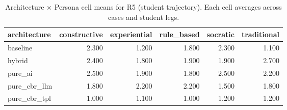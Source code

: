 \begin{table}[htbp]
\centering
\caption{Architecture × Persona cell means for R5 (student trajectory). Each cell averages across cases and student legs.}
\label{tab:cell-R5}
\begin{tabular}{lrrrrr}
\toprule
architecture & constructive & experiential & rule\_based & socratic & traditional \\
\midrule
baseline & 2.300 & 1.200 & 1.800 & 2.300 & 1.100 \\
hybrid & 2.400 & 1.800 & 1.900 & 1.900 & 2.700 \\
pure\_ai & 2.500 & 1.900 & 1.800 & 2.500 & 2.200 \\
pure\_cbr\_llm & 1.800 & 2.200 & 2.200 & 1.500 & 1.800 \\
pure\_cbr\_tpl & 1.000 & 1.100 & 1.000 & 1.200 & 1.200 \\
\bottomrule
\end{tabular}
\end{table}

